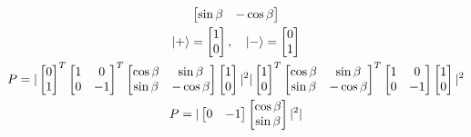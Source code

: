 \documentclass[12pt]{article}
\begin{document}
\begin{enumerate}
\begin{gather*}
\begin{bmatrix}
        \sin\beta & -\cos\beta
      \end{bmatrix}\\
      \ket{+}=
      \begin{bmatrix}
        1 \\
        0
      \end{bmatrix},\quad \ket{-}=
      \begin{bmatrix}
        0 \\
        1
      \end{bmatrix}\\
      P=|
      \begin{bmatrix}
        0 \\
        1
      \end{bmatrix}^T
      \begin{bmatrix}
        1 & 0  \\
        0 & -1
      \end{bmatrix}^T
      \begin{bmatrix}
        \cos\beta & \sin\beta  \\
        \sin\beta & -\cos\beta
      \end{bmatrix}
      \begin{bmatrix}
        1 \\
        0
      \end{bmatrix}|^2|
      \begin{bmatrix}
        1 \\
        0
      \end{bmatrix}^T
      \begin{bmatrix}
        \cos\beta & \sin\beta  \\
        \sin\beta & -\cos\beta
      \end{bmatrix}^T
      \begin{bmatrix}
        1 & 0  \\
        0 & -1
      \end{bmatrix}
      \begin{bmatrix}
        1 \\
        0
      \end{bmatrix}|^2\\
      P=|
      \begin{bmatrix}
        0 & -1\\
      \end{bmatrix}
      \begin{bmatrix}
        \cos\beta \\
        \sin\beta
      \end{bmatrix}|^2|

\end{gather*}
\end{enumerate}
\end{document}
